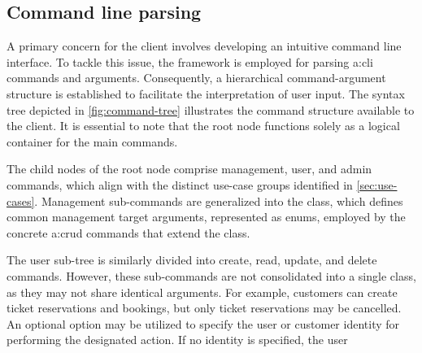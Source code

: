 \pagebreak

\subsection{Command line parsing}\label{sec:cs-cli}

A primary concern for the client involves developing an intuitive command line interface. To tackle this issue, the  framework is employed for parsing \gls{a:cli} commands and arguments. Consequently, a hierarchical command-argument structure is established to facilitate the interpretation of user input. The syntax tree depicted in \cref{fig:command-tree} illustrates the command structure available to the client. It is essential to note that the root node functions solely as a logical container for the main commands.
\begin{minipage}[t]{0.45\textwidth}
The child nodes of the root node comprise management, user, and admin commands, which align with the distinct use-case groups identified in \cref{sec:use-cases}. Management sub-commands are generalized into the  class, which defines common management target arguments, represented as enums, employed by the concrete \gls{a:crud} commands that extend the  class.

The user sub-tree is similarly divided into create, read, update, and delete commands. However, these sub-commands are not consolidated into a single class, as they may not share identical arguments. For example, customers can create ticket reservations and bookings, but only ticket reservations may be cancelled. An optional  option may be utilized to specify the user or customer identity for performing the designated action. If no identity is specified, the user%
\end{minipage}
\hfill
